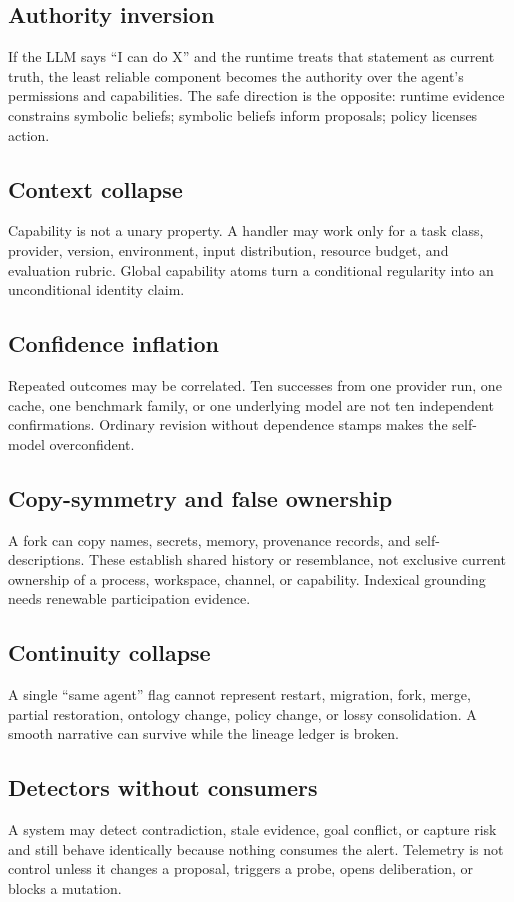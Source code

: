 \documentclass[11pt,oneside]{report}
\begin{document}
\subsection{Authority inversion}
If the LLM says ``I can do X'' and the runtime treats that statement as current truth, the least reliable component becomes the authority over the agent's permissions and capabilities. The safe direction is the opposite: runtime evidence constrains symbolic beliefs; symbolic beliefs inform proposals; policy licenses action.

\subsection{Context collapse}
Capability is not a unary property. A handler may work only for a task class, provider, version, environment, input distribution, resource budget, and evaluation rubric. Global capability atoms turn a conditional regularity into an unconditional identity claim.

\subsection{Confidence inflation}
Repeated outcomes may be correlated. Ten successes from one provider run, one cache, one benchmark family, or one underlying model are not ten independent confirmations. Ordinary revision without dependence stamps makes the self-model overconfident.

\subsection{Copy-symmetry and false ownership}
A fork can copy names, secrets, memory, provenance records, and self-descriptions. These establish shared history or resemblance, not exclusive current ownership of a process, workspace, channel, or capability. Indexical grounding needs renewable participation evidence.

\subsection{Continuity collapse}
A single ``same agent'' flag cannot represent restart, migration, fork, merge, partial restoration, ontology change, policy change, or lossy consolidation. A smooth narrative can survive while the lineage ledger is broken.

\subsection{Detectors without consumers}
A system may detect contradiction, stale evidence, goal conflict, or capture risk and still behave identically because nothing consumes the alert. Telemetry is not control unless it changes a proposal, triggers a probe, opens deliberation, or blocks a mutation.
\end{document}
